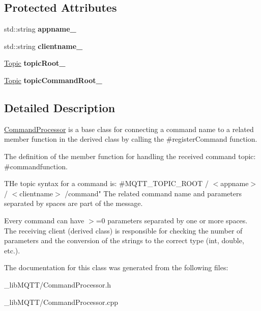 \subsection*{Protected Attributes}
\begin{DoxyCompactItemize}
\item 
\mbox{\label{class_command_processor_aab13edb02dbcc123e831e1cce20695a0}} 
std\+::string {\bfseries appname\+\_\+}
\item 
\mbox{\label{class_command_processor_a3922d658643297c47765181a251b10d3}} 
std\+::string {\bfseries clientname\+\_\+}
\item 
\mbox{\label{class_command_processor_a97f0d615c62c8c7e1712522c4577ea53}} 
\mbox{\hyperlink{class_topic}{Topic}} {\bfseries topic\+Root\+\_\+}
\item 
\mbox{\label{class_command_processor_ac695d4ff50c2dd91b25c8079b22170e4}} 
\mbox{\hyperlink{class_topic}{Topic}} {\bfseries topic\+Command\+Root\+\_\+}
\end{DoxyCompactItemize}


\subsection{Detailed Description}
\mbox{\hyperlink{class_command_processor}{Command\+Processor}} is a base class for connecting a command name to a related member function in the derived class by calling the \#register\+Command function.

The definition of the member function for handling the received command topic\+: \#commandfunction.

T\+He topic syntax for a command is\+: \#\+M\+Q\+T\+T\+\_\+\+T\+O\+P\+I\+C\+\_\+\+R\+O\+OT / $<$appname$>$ / $<$clientname$>$ /command" The related command name and parameters separated by spaces are part of the message.

Every command can have $>$=0 parameters separated by one or more spaces. The receiving client (derived class) is responsible for checking the number of parameters and the conversion of the strings to the correct type (int, double, etc.). 

The documentation for this class was generated from the following files\+:\begin{DoxyCompactItemize}
\item 
\+\_\+lib\+M\+Q\+T\+T/Command\+Processor.\+h\item 
\+\_\+lib\+M\+Q\+T\+T/Command\+Processor.\+cpp\end{DoxyCompactItemize}
